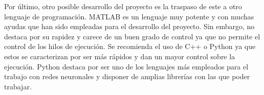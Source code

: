 Por último, otro posible desarrollo del proyecto es la traspaso de este a otro lenguaje de programación. MATLAB es un lenguaje muy potente y con muchas ayudas que han sido empleadas para el desarrollo del proyecto. Sin embargo, no destaca por su rapidez y carece de un buen grado de control ya que no permite el control de los hilos de ejecución. Se recomienda el uso de C++ o Python ya que estos se caracterizan por ser más rápidos y dan un mayor control sobre la ejecución. Python destaca por ser uno de los lenguajes más empleados para el trabajo con redes neuronales y disponer de amplias librerías con las que poder trabajar.
